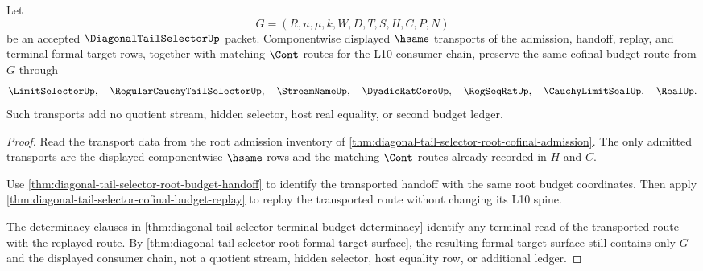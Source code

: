 \begin{theorem}
\label{thm:diagonal-tail-selector-root-budget-transport}
Let
$$
G=(R,n,\mu,k,W,D,T,S,H,C,P,N)
$$
be an accepted $\DiagonalTailSelectorUp$ packet. Componentwise displayed
$\hsame$ transports of the admission, handoff, replay, and terminal
formal-target rows, together with matching $\Cont$ routes for the L10
consumer chain, preserve the same cofinal budget route from $G$ through
$$
\LimitSelectorUp,\quad
\RegularCauchyTailSelectorUp,\quad
\StreamNameUp,\quad
\DyadicRatCoreUp,\quad
\RegSeqRatUp,\quad
\CauchyLimitSealUp,\quad
\RealUp.
$$
Such transports add no quotient stream, hidden selector, host real equality,
or second budget ledger.
\end{theorem}
\begin{proof}
Read the transport data from the root admission inventory of
\autoref{thm:diagonal-tail-selector-root-cofinal-admission}. The only
admitted transports are the displayed componentwise $\hsame$ rows and the
matching $\Cont$ routes already recorded in $H$ and $C$.

Use \autoref{thm:diagonal-tail-selector-root-budget-handoff} to identify the
transported handoff with the same root budget coordinates. Then apply
\autoref{thm:diagonal-tail-selector-cofinal-budget-replay} to replay the
transported route without changing its L10 spine.

The determinacy clauses in
\autoref{thm:diagonal-tail-selector-terminal-budget-determinacy} identify
any terminal read of the transported route with the replayed route. By
\autoref{thm:diagonal-tail-selector-root-formal-target-surface}, the
resulting formal-target surface still contains only $G$ and the displayed
consumer chain, not a quotient stream, hidden selector, host equality row, or
additional ledger.
\end{proof}

